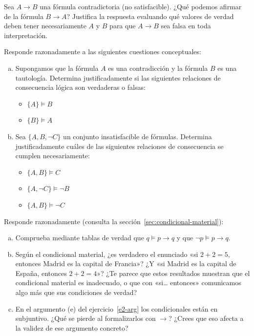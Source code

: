 \begin{pregunta}
Sea $A \to B$ una fórmula contradictoria (no satisfacible). ¿Qué podemos afirmar de la fórmula $B \to A$? Justifica la respuesta evaluando qué valores de verdad deben tener necesariamente $A$ y $B$ para que $A \to B$ sea falsa en toda interpretación.
\end{pregunta}

\begin{pregunta}\label{e2-cuest}
Responde razonadamente a las siguientes cuestiones conceptuales:
\begin{enumerate}[(a)]
    \item Supongamos que la fórmula $A$ es una contradicción y la fórmula $B$ es una tautología. Determina justificadamente si las siguientes relaciones de consecuencia lógica son verdaderas o falsas:
    \begin{itemize}
        \item $\{A\} \models B$
        \item $\{B\} \models A$
    \end{itemize}
    \item Sea $\{A, B, \neg C\}$ un conjunto insatisfacible de fórmulas. Determina justificadamente cuáles de las siguientes relaciones de consecuencia se cumplen necesariamente:
    \begin{itemize}
        \item $\{A, B\} \models C$
        \item $\{A, \neg C\} \models \neg B$
        \item $\{A, B\} \models \neg C$
    \end{itemize}
\end{enumerate}
\end{pregunta}

\begin{pregunta}\label{e2-cond}
Responde razonadamente (consulta la sección~\ref{sec:condicional-material}):
\begin{enumerate}[(a)]
    \item Comprueba mediante tablas de verdad que $q \models p \to q$ y que $\neg p \models p \to q$.
    \item Según el condicional material, ¿es verdadero el enunciado «si $2 + 2 = 5$, entonces Madrid es la capital de Francia»? ¿Y «si Madrid es la capital de España, entonces $2 + 2 = 4$»? ¿Te parece que estos resultados muestran que el condicional material es inadecuado, o que con «si\ldots{} entonces» comunicamos algo más que sus condiciones de verdad?
    \item En el argumento (e) del ejercicio~\ref{e2-arg} los condicionales están en subjuntivo. ¿Qué se pierde al formalizarlos con $\to$? ¿Crees que eso afecta a la validez de ese argumento concreto?
\end{enumerate}
\end{pregunta}

